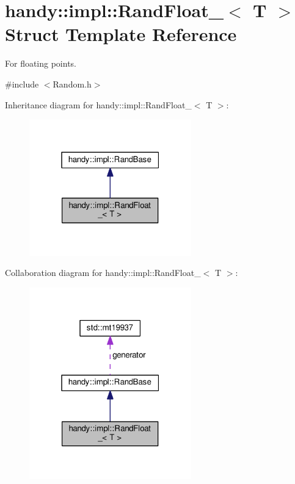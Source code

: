 \hypertarget{structhandy_1_1impl_1_1RandFloat__}{}\section{handy\+:\+:impl\+:\+:Rand\+Float\+\_\+$<$ T $>$ Struct Template Reference}
\label{structhandy_1_1impl_1_1RandFloat__}


For floating points.  




{\ttfamily \#include $<$Random.\+h$>$}



Inheritance diagram for handy\+:\+:impl\+:\+:Rand\+Float\+\_\+$<$ T $>$\+:\nopagebreak
\begin{figure}[H]
\begin{center}
\leavevmode
\includegraphics[width=199pt]{structhandy_1_1impl_1_1RandFloat____inherit__graph}
\end{center}
\end{figure}


Collaboration diagram for handy\+:\+:impl\+:\+:Rand\+Float\+\_\+$<$ T $>$\+:\nopagebreak
\begin{figure}[H]
\begin{center}
\leavevmode
\includegraphics[width=199pt]{structhandy_1_1impl_1_1RandFloat____coll__graph}
\end{center}
\end{figure}
